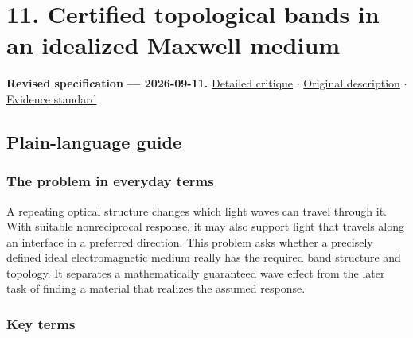 \documentclass[
  11pt,
]{article}
\begin{document}
\section{11. Certified topological bands in an idealized Maxwell medium}

\textbf{Revised specification --- 2026-09-11.}
\href{https://github.com/rick-stevens-ai/Pure-Thought/blob/main/reviews/11-Photonic-Topological-Crystals.md}{Detailed
critique} \ensuremath{\cdot}
\href{https://github.com/rick-stevens-ai/Pure-Thought/blob/main/archive/original-PRDs/11-Photonic-Topological-Crystals.md}{Original
description} \ensuremath{\cdot}
\href{https://github.com/rick-stevens-ai/Pure-Thought/blob/main/reviews/EVIDENCE-STANDARD.md}{Evidence
standard}

\subsection{Plain-language guide}

\subsubsection{The problem in everyday terms}

A repeating optical structure changes which light waves can travel
through it. With suitable nonreciprocal response, it may also support
light that travels along an interface in a preferred direction. This
problem asks whether a precisely defined ideal electromagnetic medium
really has the required band structure and topology. It separates a
mathematically guaranteed wave effect from the later task of finding a
material that realizes the assumed response.

\subsubsection{Key terms}
\end{document}

